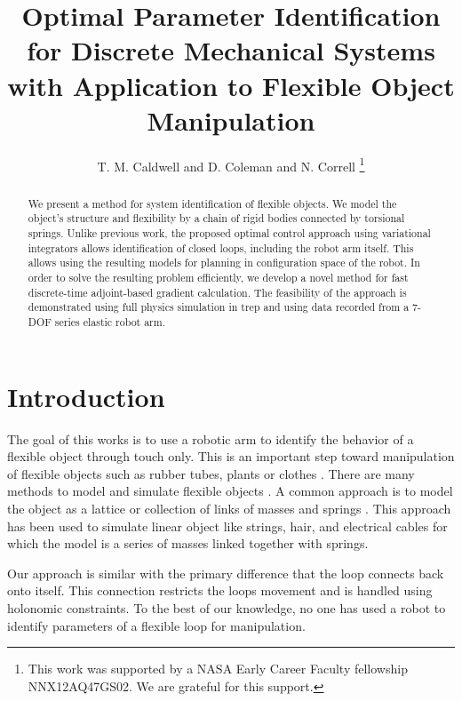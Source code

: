 \documentclass[letterpaper, 10pt, conference]{ieeeconf}
\title{Optimal Parameter Identification for Discrete Mechanical Systems with Application to Flexible Object Manipulation}
\author{T. M. Caldwell and  D. Coleman and N. Correll%
\thanks{
This work was supported by a NASA
Early Career Faculty fellowship NNX12AQ47GS02. We are grateful for this support.}%
}
\begin{document}
\maketitle

\begin{abstract}
We present a method for system identification of flexible objects. We model the object's structure and flexibility by a chain of rigid bodies connected by torsional springs. Unlike previous work, the proposed optimal control approach using variational integrators allows identification of closed loops, including the robot arm itself. This allows using the resulting models for planning in configuration space of the robot. In order to solve the resulting problem efficiently, we develop a novel method for fast discrete-time adjoint-based gradient calculation. The feasibility of the approach is demonstrated using full physics simulation in trep and using data recorded from a 7-DOF series elastic robot arm.
\end{abstract}

\section{Introduction}
The goal of this works is to use a robotic arm to identify the behavior of a flexible object through touch only. This is an important step toward manipulation of flexible objects such as rubber tubes, plants or clothes \cite{wakamatsu2006knotting,saha2007manipulation,bell2010flexible,jimenez2012survey}.  
There are many methods to model and simulate flexible objects \cite{khalil_payeur, lang_etal}.  A common approach is to model the object as a lattice or collection of links of masses and springs \cite{sahari_etal, wakamatsu_etal, khalil_payeur}.  This approach has been used to simulate linear object like strings, hair, and electrical cables for which the model is a series of masses linked together with springs. %

Our approach is similar with the primary difference that the loop connects back onto itself.  This connection restricts the loops movement and is handled using holonomic constraints.  To the best of our knowledge, no one has used a robot to identify parameters of a flexible loop for manipulation.
\end{document}
